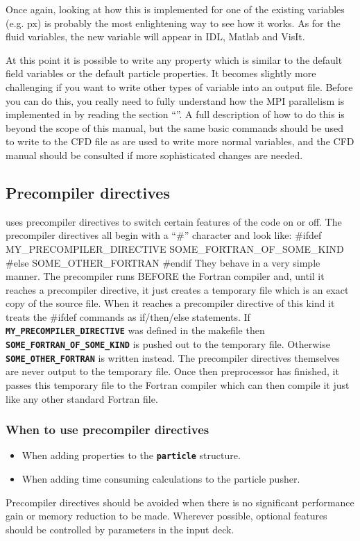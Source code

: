 \documentclass[12pt,a4paper]{article}
\newcommand{\inlinecode}[1]{{\color{warwickred} \bf\texttt{#1}}}
\newcommand{\EPOCH}{{\color{warwickdark}\fontfamily{phv}\selectfont{EPOCH}}}
\newenvironment{boxverbatim}{\lboxverbatim{none}}{\endlboxverbatim}
\begin{document}
Once again, looking at how this is implemented for one of the existing
variables (e.g. px) is probably the most enlightening way to see how it
works. As for the fluid variables, the new variable will appear in IDL, Matlab
and VisIt.

At this point it is possible to write any property which is similar to the
default field variables or the default particle properties. It becomes slightly
more challenging if you want to write other types of variable into an output
file. Before you can do this, you really need to fully understand how the MPI
parallelism is implemented in {\EPOCH} by reading the section
``''. A full description of how to do this is beyond the
scope of this manual, but the same basic commands should be used to write to
the CFD file as are used to write more normal variables, and the CFD manual
should be consulted if more sophisticated changes are needed.

\pagebreak

\subsection{Precompiler directives}
{\EPOCH} uses precompiler directives to switch certain features of the code on
or off. The precompiler directives all begin with a ``\#'' character and look
like:
\begin{boxverbatim}
#ifdef MY_PRECOMPILER_DIRECTIVE
  SOME_FORTRAN_OF_SOME_KIND
#else
  SOME_OTHER_FORTRAN
#endif
\end{boxverbatim}
They behave in a very simple manner. The precompiler runs BEFORE the
Fortran compiler and, until it reaches a precompiler directive, it just creates
a temporary file which is an exact copy of the source file. When it reaches a
precompiler directive of this kind it treats the \#ifdef commands as
if/then/else statements. If
\inlinecode{MY\_PRECOMPILER\_DIRECTIVE} was defined in the makefile then
\inlinecode{SOME\_FORTRAN\_OF\_SOME\_KIND} is pushed out to the temporary
file. Otherwise \inlinecode{SOME\_OTHER\_FORTRAN} is written instead.
The precompiler directives themselves are never output to the temporary
file. Once then preprocessor has finished, it passes this temporary file
to the Fortran compiler which can then compile it just like any other
standard Fortran file.

\subsubsection{When to use precompiler directives}
\begin{itemize}
\item When adding properties to the \inlinecode{particle} structure.
\item When adding time consuming calculations to the particle pusher.
\end{itemize}
Precompiler directives should be avoided when there is no significant
performance gain or memory reduction to be made. Wherever possible, optional
features should be controlled by parameters in the input deck.
\end{document}
